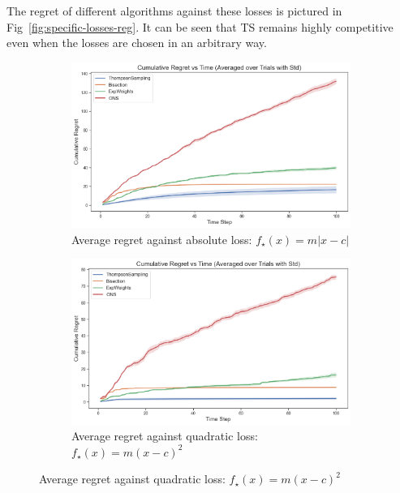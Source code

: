 \documentclass[letter, 12pt]{report}
\newcommand{\1}{\mathbf{1}}
\newcommand{\ts}{\textsc{TS}\xspace}
\theoremstyle{plain}
\theoremstyle{definition}
\theoremstyle{remark}
\begin{document}
The regret of different algorithms against these losses is pictured
in Fig~\ref{fig:specific-losses-reg}.
It can be seen that \ts remains highly competitive even when
the losses are chosen in an arbitrary way.
\begin{figure}[h!]
    \centering
    \begin{subfigure}{10cm}
        \centering
        \includegraphics[width=\textwidth]{figures/absolute_reg.png}
        \caption{Average regret against absolute loss: $f_\star(x) = m|x - c|$}
        \label{fig:absolute-loss-regret}
    \end{subfigure}

    \vspace{0.5em}
    \begin{subfigure}{10cm}
        \centering
        \includegraphics[width=\textwidth]{figures/quad_reg.png}
        \caption{Average regret against quadratic loss: $f_\star(x) = m(x - c)^2$}
        \label{fig:quadratic-loss-regret}
    \end{subfigure}


\end{figure}
\end{document}
